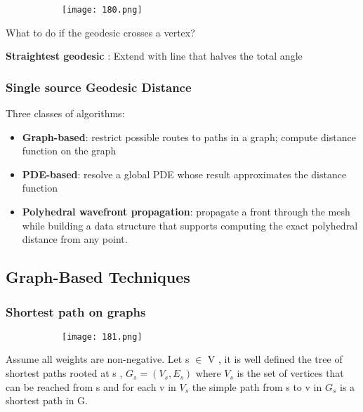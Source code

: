 \documentclass{article}
\begin{document}
   \begin{figure}[ht!]
  \centering
  \begin{subfigure}[b]{0.6\linewidth}
    \texttt{[image: 180.png]}
  \end{subfigure}
\end{figure}

What to do if the geodesic crosses a vertex?

\textbf{Straightest geodesic} : Extend with line that halves the total angle

\subsubsection{Single source Geodesic Distance}

Three classes of algorithms:

\begin{itemize}
    \item \textbf{Graph-based}: restrict possible routes to paths in a graph; compute distance function on the graph
    \item \textbf{PDE-based}: resolve a global PDE whose result approximates the distance function
    \item \textbf{Polyhedral wavefront propagation}: propagate a front through the mesh while building a data structure that supports computing the exact polyhedral distance from any point.
\end{itemize}

\vspace{20mm}

\subsection{Graph-Based Techniques}

\subsubsection{Shortest path on graphs}

   \begin{figure}[ht!]
  \centering
  \begin{subfigure}[b]{0.9\linewidth}
    \texttt{[image: 181.png]}
  \end{subfigure}
\end{figure}

Assume all weights are non-negative. Let s $\in$ V , it is well defined the tree of shortest paths rooted at s , $G_s = (V_s,E_s)$ where $V_s$ is the set of vertices that can be reached from s and for each v in $V_s$ the simple path from s to v in $G_s$ is a shortest path in G.
\end{document}
